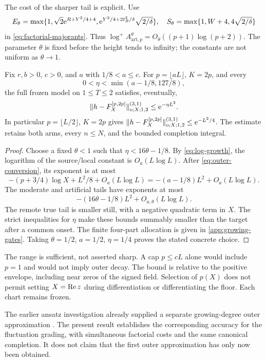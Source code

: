 The cost of the sharper tail is explicit. Use
\[
 E_\theta=\max\{1,\sqrt2\mathrm e^{R+Y^2/4+4},
        \mathrm e^{Y^2/4+2t_R^2/\delta}\sqrt{2/\delta}\},
 \quad
 S_\theta=\max\{1,W+4,4\sqrt{2/\delta}\}
\]
in \eqref{eq:factorial-majorants}.
Thus \(\log^+A_{\mathrm{art},p}^\theta
=O_\theta((p+1)\log(p+2))\).
The parameter \(\theta\) is fixed before the height tends to
infinity; the constants are not uniform as \(\theta\to1\).

\begin{theorem}\label{thm:growing}
Fix \(r,b>0\), \(c>0\), and \(a\) with \(1/8<a\le c\).
For \(p=\lfloor aL\rfloor\), \(K=2p\), and every
\[
 0<\eta<\min(a-1/8,127/8),
\]
the full frozen model on \(1\le T\le2\) satisfies, eventually,
\begin{equation}
 \lVert h-F_X^{[p,2p]}\rVert_{\mathrm o;X;1,2}^{(3,1)}\le\mathrm e^{-\eta L^2}.
 \label{eq:growing-result}
\end{equation}
In particular \(p=\lfloor L/2\rfloor\), \(K=2p\) gives
\(\lVert h-F_X^{[p,2p]}\rVert_{\mathrm o;X;1,2}^{(3,1)}\le\mathrm e^{-L^2/4}\).
The estimate retains both arms, every \(n\le N\), and the bounded
completion integral.
\end{theorem}
\begin{proof}
Choose a fixed \(\theta<1\) such that
\(\eta<16\theta-1/8\).
By \eqref{eq:log-growth}, the logarithm of the source/local
constant is \(O_a(L\log L)\).
After \eqref{eq:outer-conversion}, its exponent is at most
\[
 -(p+3/4)\log X+L^2/8+O_a(L\log L)
 =-(a-1/8)L^2+O_a(L\log L).
\]
The moderate and artificial tails have exponents at most
\[
 -(16\theta-1/8)L^2+O_{a,\theta}(L\log L).
\]
The remote true tail is smaller still, with a negative quadratic
term in \(X\).
The strict inequalities for \(\eta\) make these bounds summably
smaller than the target after a common onset.
The finite four-part allocation is given in \cref{app:growing-gates}.
Taking \(\theta=1/2\), \(a=1/2\), \(\eta=1/4\) proves the
stated concrete choice.
\end{proof}
The range is sufficient, not asserted sharp. A cap \(p\le cL\)
alone would include \(p=1\) and would not imply outer decay.
The bound is relative to the positive envelope, including near
zeros of the signed field. Selection of \(p(X)\) does not permit
setting \(X=\operatorname{Re} z\) during differentiation or differentiating
the floor. Each chart remains frozen.

The earlier ansatz investigation already supplied a separate
growing-degree outer approximation \cite{ans05}.
The present result establishes the corresponding accuracy for
the fluctuation grading, with simultaneous factorial costs and
the same canonical completion. It does not claim that the first
outer approximation has only now been obtained.
